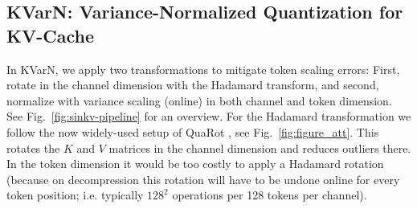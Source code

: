 \documentclass{article}
\newcommand{\methodname}{KVarN\xspace}
\begin{document}
\subsection{\methodname: Variance-Normalized Quantization for KV-Cache}
\label{sec:sinq-kv}
In KVarN, we apply two transformations to mitigate token scaling errors: First, rotate in the channel dimension with the Hadamard transform, and second, normalize with variance scaling (online) in both channel and token dimension. See Fig.~\ref{fig:sinkv-pipeline} for an overview. For the Hadamard transformation we follow the now widely-used setup of QuaRot \cite{ashkboos2024quarot}, see Fig.~\ref{fig:figure_att}. This rotates the $K$ and $V$ matrices in the channel dimension and reduces outliers there. 
In the token dimension it would be too costly to apply a Hadamard rotation (because on decompression this rotation will have to be undone online for every token position; i.e. typically $128^2$ operations per 128 tokens per channel).  



\end{document}
